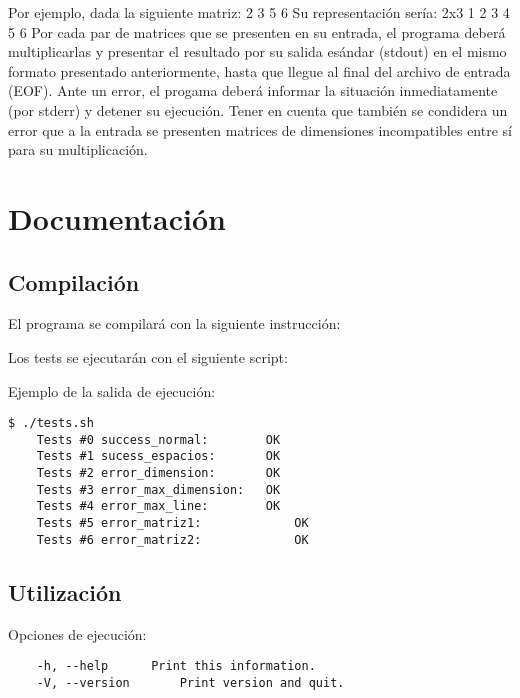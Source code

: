 \documentclass[a4paper,10pt]{article}
\begin{document}
Por ejemplo, dada la siguiente matriz:
 2 3
 5 6
\newline \newline
Su representaci\'on ser\'ia:
\newline
2x3 1 2 3 4 5 6
\newline \newline
Por cada par de matrices que se presenten en su entrada, el programa deber\'a multiplicarlas y presentar el resultado por su salida es\'andar (stdout) en el mismo formato presentado anteriormente, hasta que llegue al final del archivo de entrada (EOF). Ante un error, el progama
deber\'a informar la situaci\'on inmediatamente (por stderr) y detener su ejecuci\'on. Tener en cuenta que tambi\'en se condidera un error que a la entrada se presenten matrices de dimensiones incompatibles entre s\'i para su multiplicaci\'on.

\pagebreak


\section{Documentaci\'on}

\subsection{Compilaci\'on}
El programa se compilar\'a con la siguiente instrucci\'on:
\begin{center} 
\end{center}

Los tests se ejecutar\'an con el siguiente script:
\begin{center} 
\end{center}

Ejemplo de la salida de ejecuci\'on:
\begin{verbatim}
$ ./tests.sh
	Tests #0 success_normal: 		OK
	Tests #1 sucess_espacios: 		OK
	Tests #2 error_dimension: 		OK
	Tests #3 error_max_dimension: 	OK
	Tests #4 error_max_line: 		OK
	Tests #5 error_matriz1: 			OK
	Tests #6 error_matriz2: 			OK
\end{verbatim}

\subsection{Utilizaci\'on}
Opciones de ejecuci\'on:
\begin{verbatim}
	-h, --help		Print this information.
	-V, --version		Print version and quit.
\end{verbatim}
\end{document}
